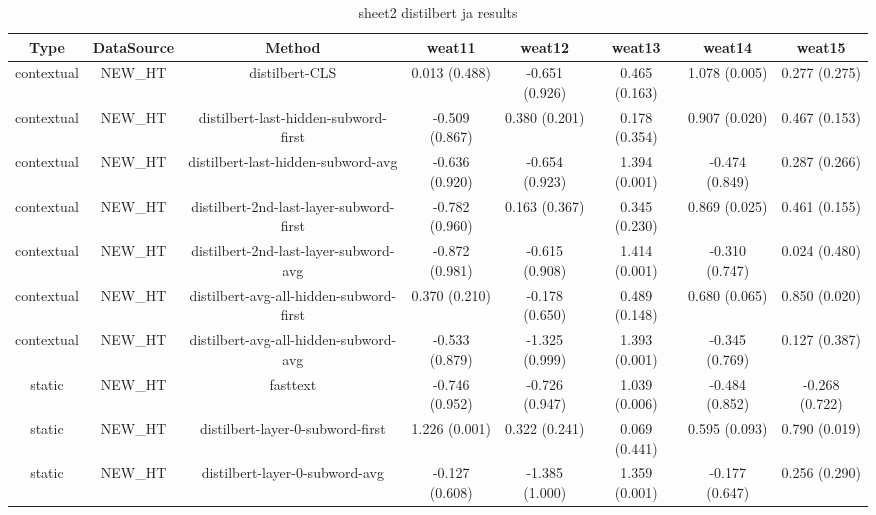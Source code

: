 \begin{sidewaystable}[htb]
    \centering
    \caption{sheet2 distilbert ja results}
    \label{appendix_tab:sheet2_distilbert_ja_results}
    \small
    \begin{tabular}{@{}cccccccc@{}}
        \toprule
        Type & DataSource & Method & weat11 & weat12 & weat13 & weat14 & weat15 \\
        \midrule
        contextual & NEW\_HT & distilbert-CLS & 0.013 (0.488) & -0.651 (0.926) & 0.465 (0.163) & 1.078 (0.005) & 0.277 (0.275) \\
        contextual & NEW\_HT & distilbert-last-hidden-subword-first & -0.509 (0.867) & 0.380 (0.201) & 0.178 (0.354) & 0.907 (0.020) & 0.467 (0.153) \\
        contextual & NEW\_HT & distilbert-last-hidden-subword-avg & -0.636 (0.920) & -0.654 (0.923) & 1.394 (0.001) & -0.474 (0.849) & 0.287 (0.266) \\
        contextual & NEW\_HT & distilbert-2nd-last-layer-subword-first & -0.782 (0.960) & 0.163 (0.367) & 0.345 (0.230) & 0.869 (0.025) & 0.461 (0.155) \\
        contextual & NEW\_HT & distilbert-2nd-last-layer-subword-avg & -0.872 (0.981) & -0.615 (0.908) & 1.414 (0.001) & -0.310 (0.747) & 0.024 (0.480) \\
        contextual & NEW\_HT & distilbert-avg-all-hidden-subword-first & 0.370 (0.210) & -0.178 (0.650) & 0.489 (0.148) & 0.680 (0.065) & 0.850 (0.020) \\
        contextual & NEW\_HT & distilbert-avg-all-hidden-subword-avg & -0.533 (0.879) & -1.325 (0.999) & 1.393 (0.001) & -0.345 (0.769) & 0.127 (0.387) \\
        static & NEW\_HT & fasttext & -0.746 (0.952) & -0.726 (0.947) & 1.039 (0.006) & -0.484 (0.852) & -0.268 (0.722) \\
        static & NEW\_HT & distilbert-layer-0-subword-first & 1.226 (0.001) & 0.322 (0.241) & 0.069 (0.441) & 0.595 (0.093) & 0.790 (0.019) \\
        static & NEW\_HT & distilbert-layer-0-subword-avg & -0.127 (0.608) & -1.385 (1.000) & 1.359 (0.001) & -0.177 (0.647) & 0.256 (0.290) \\
        \bottomrule
    \end{tabular}
\end{sidewaystable}